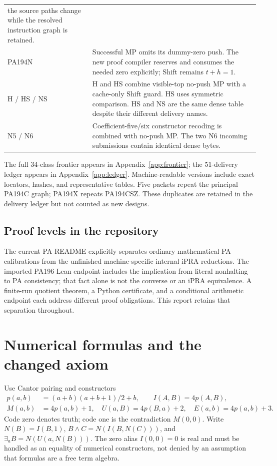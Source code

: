 \documentclass[11pt,letterpaper]{article}
\begin{document}
\begin{longtable}{p{}p{}}
the source paths change while the resolved instruction graph is retained.\\[4pt]
PA194N&Successful MP omits its dummy-zero push. The new proof compiler
reserves and consumes the needed zero explicitly; Shift remains $t+h=1$.\\[4pt]
H / HS / NS&H and HS combine visible-top no-push MP with a cache-only
Shift guard. HS uses symmetric comparison. HS and NS are the same dense
table despite their different delivery names.\\[4pt]
N5 / N6&Coefficient-five/six constructor recoding is combined with no-push
MP. The two N6 incoming submissions contain identical dense bytes.\\
\bottomrule
\end{longtable}

The full 34-class frontier appears in Appendix~\ref{app:frontier}; the
51-delivery ledger appears in Appendix~\ref{app:ledger}. Machine-readable
versions include exact locators, hashes, and representative tables.
Five packets repeat the principal PA194C graph; PA194X repeats PA194CSZ.
These duplicates are retained in the delivery ledger but not counted as
new designs.

\subsection{Proof levels in the repository}

The current PA README explicitly separates ordinary mathematical PA
calibrations from the unfinished machine-specific internal iPRA reductions.
The imported PA196 Lean endpoint includes the implication from literal
nonhalting to PA consistency; that fact alone is not the converse or an
iPRA equivalence. A finite-run quotient theorem, a Python certificate, and
a conditional arithmetic endpoint each address different proof obligations.
This report retains that separation throughout.

\section{Numerical formulas and the changed axiom}
\label{sec:logic}

Use Cantor pairing and constructors
\[
\begin{split}
p(a,b)&=(a+b)(a+b+1)/2+b,\qquad I(A,B)=4p(A,B),\\
M(a,b)&=4p(a,b)+1,\quad U(a,B)=4p(B,a)+2,\quad E(a,b)=4p(a,b)+3.
\end{split}
\]
Code zero denotes truth; code one is the contradiction $M(0,0)$.
Write $N(B)=I(B,1)$, $B\wedge C=N(I(B,N(C)))$, and
$\exists_a B=N(U(a,N(B)))$. The zero alias $I(0,0)=0$ is real and must
be handled as an equality of numerical constructors, not denied by an
assumption that formulas are a free term algebra.
\end{document}
